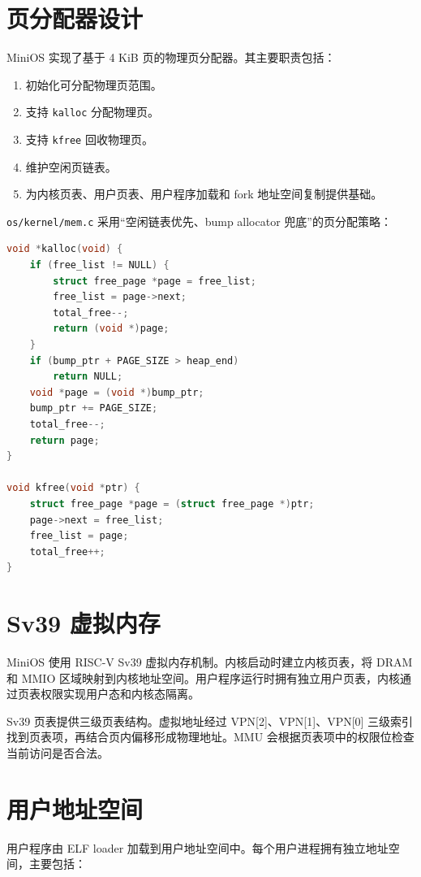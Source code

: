 \documentclass[UTF8,a4paper,12pt,openany,fontset=fandol]{ctexrep}
\begin{document}
\section{页分配器设计}

MiniOS 实现了基于 4 KiB 页的物理页分配器。其主要职责包括：

\begin{enumerate}
\item 初始化可分配物理页范围。
\item 支持 \nolinkurl{kalloc} 分配物理页。
\item 支持 \nolinkurl{kfree} 回收物理页。
\item 维护空闲页链表。
\item 为内核页表、用户页表、用户程序加载和 fork 地址空间复制提供基础。
\end{enumerate}

\nolinkurl{os/kernel/mem.c} 采用“空闲链表优先、bump allocator 兜底”的页分配策略：

\begin{lstlisting}[language=c]
void *kalloc(void) {
    if (free_list != NULL) {
        struct free_page *page = free_list;
        free_list = page->next;
        total_free--;
        return (void *)page;
    }
    if (bump_ptr + PAGE_SIZE > heap_end)
        return NULL;
    void *page = (void *)bump_ptr;
    bump_ptr += PAGE_SIZE;
    total_free--;
    return page;
}

void kfree(void *ptr) {
    struct free_page *page = (struct free_page *)ptr;
    page->next = free_list;
    free_list = page;
    total_free++;
}
\end{lstlisting}

\section{Sv39 虚拟内存}

MiniOS 使用 RISC-V Sv39 虚拟内存机制。内核启动时建立内核页表，将 DRAM 和 MMIO 区域映射到内核地址空间。用户程序运行时拥有独立用户页表，内核通过页表权限实现用户态和内核态隔离。

Sv39 页表提供三级页表结构。虚拟地址经过 VPN[2]、VPN[1]、VPN[0] 三级索引找到页表项，再结合页内偏移形成物理地址。MMU 会根据页表项中的权限位检查当前访问是否合法。

\section{用户地址空间}

用户程序由 ELF loader 加载到用户地址空间中。每个用户进程拥有独立地址空间，主要包括：
\end{document}
